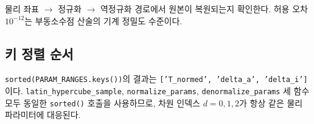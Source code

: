 \documentclass[11pt]{article}
\begin{document}
물리 좌표 $\to$ 정규화 $\to$ 역정규화 경로에서 원본이 복원되는지 확인한다.
허용 오차 $10^{-12}$는 부동소수점 산술의 기계 정밀도 수준이다.

\subsection{키 정렬 순서}

\texttt{sorted(PARAM\_RANGES.keys())}의 결과는 \texttt{['T\_normed', 'delta\_a', 'delta\_i']}이다.
\texttt{latin\_hypercube\_sample}, \texttt{normalize\_params}, \texttt{denormalize\_params} 세 함수 모두
동일한 \texttt{sorted()} 호출을 사용하므로,
차원 인덱스 $d = 0, 1, 2$가 항상 같은 물리 파라미터에 대응된다.




\end{document}
